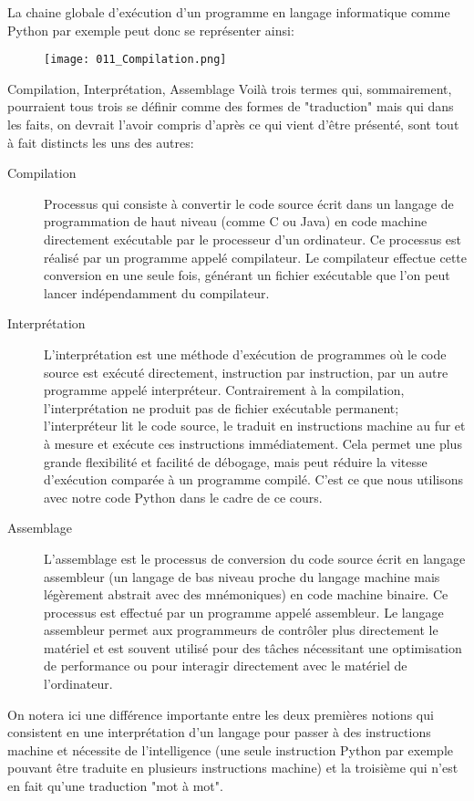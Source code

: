 \documentclass[12pt]{article}
\begin{document}
	 La chaine globale d'exécution d'un programme en langage informatique comme Python par exemple peut donc se représenter ainsi:
	 
	 \begin{figure}[H]
	 	\centering
	 	\texttt{[image: 011\_Compilation.png]}
	 \end{figure}
	 
	 \begin{MaDef}{Compilation, Interprétation, Assemblage}
	 	Voilà trois termes qui, sommairement, pourraient tous trois se définir comme des formes de "traduction" mais qui dans les faits, on devrait l'avoir compris d'après ce qui vient d'être présenté, sont tout à fait distincts les uns des autres:
	 	\begin{description}
	 		\item[Compilation] Processus qui consiste à convertir le code source écrit dans un langage de programmation de haut niveau (comme C ou Java) en code machine directement exécutable par le processeur d'un ordinateur. Ce processus est réalisé par un programme appelé compilateur. Le compilateur effectue cette conversion en une seule fois, générant un fichier exécutable que l'on peut lancer indépendamment du compilateur.
	 		\item[Interprétation] L'interprétation est une méthode d'exécution de programmes où le code source est exécuté directement, instruction par instruction, par un autre programme appelé interpréteur. Contrairement à la compilation, l'interprétation ne produit pas de fichier exécutable permanent; l'interpréteur lit le code source, le traduit en instructions machine au fur et à mesure et exécute ces instructions immédiatement. Cela permet une plus grande flexibilité et facilité de débogage, mais peut réduire la vitesse d'exécution comparée à un programme compilé. C'est ce que nous utilisons avec notre code Python dans le cadre de ce cours.
	 		\item[Assemblage] L'assemblage est le processus de conversion du code source écrit en langage assembleur (un langage de bas niveau proche du langage machine mais légèrement abstrait avec des mnémoniques) en code machine binaire. Ce processus est effectué par un programme appelé assembleur. Le langage assembleur permet aux programmeurs de contrôler plus directement le matériel et est souvent utilisé pour des tâches nécessitant une optimisation de performance ou pour interagir directement avec le matériel de l'ordinateur.
	 	\end{description}
	 	
	 	On notera ici une différence importante entre les deux premières notions qui consistent en une interprétation d'un langage pour passer à des instructions machine et nécessite de l'intelligence (une seule instruction Python par exemple pouvant être traduite en plusieurs instructions machine) et la troisième qui n'est en fait qu'une traduction "mot à mot".
	 \end{MaDef}
	 
\end{document}
